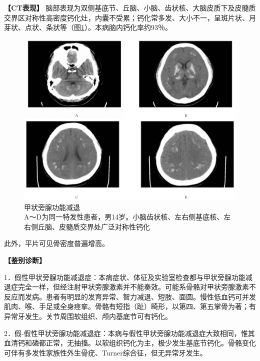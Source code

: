 \textbf{【CT表现】}
脑部表现为双侧基底节、丘脑、小脑、齿状核、大脑皮质下及皮髓质交界区对称性高密度钙化灶，内囊不受累；钙化常多发、大小不一，呈斑片状、月芽状、点状、条状等（图\ref{fig8-12}）。本病脑内钙化率约93％。

\begin{figure}[!htbp]
 \centering
 \includegraphics[width=.7\textwidth,height=\textheight,keepaspectratio]{./images/Image00180.jpg}
 \captionsetup{justification=centering}
 \caption{甲状旁腺功能减退\\{\small A～D为同一特发性患者，男14岁。小脑齿状核、左右侧基底核、左右侧丘脑、皮髓质交界处广泛对称性钙化}}
 \label{fig8-12}
  \end{figure} 

此外，平片可见骨密度普遍增高。

\textbf{【鉴别诊断】}

1．假性甲状旁腺功能减退症：本病症状、体征及实验室检查都与甲状旁腺功能减退症完全一样，但经注射甲状旁腺激素并不能奏效。可能系骨骼对甲状旁腺激素不反应而发病。患者有明显的发育异常、智力减退、短肢、面圆。慢性低血钙可并发肌肉、喉、手足或全身痉挛。骨骼有短指（趾）畸形，以第四、第五掌骨为著；有异常牙发生。关节周围软组织、颅内基底节可有钙化。

2．假-假性甲状旁腺功能减退症：本病与假性甲状旁腺功能减退症大致相同，惟其血清钙和磷都正常，无抽搐。以软组织钙化为主，极少发生基底节钙化。骨骼变化可伴有多发性家族性外生骨疣、Turner综合征，但无异常牙发生。

\protect\hypertarget{text00016.html}{}{}

